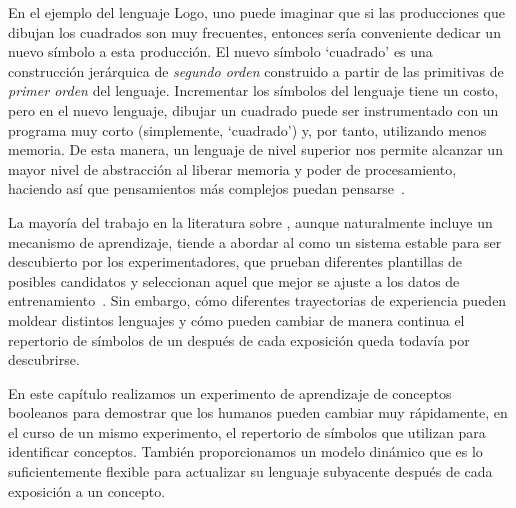En el ejemplo del lenguaje Logo, uno puede imaginar que si las producciones que dibujan los cuadrados son muy frecuentes, entonces sería conveniente dedicar un nuevo símbolo a esta producción. El nuevo símbolo `cuadrado' es una construcción jerárquica de {\em segundo orden} construido a partir de las primitivas de {\em primer orden} del lenguaje. Incrementar los símbolos del lenguaje tiene un costo, pero en el nuevo lenguaje, dibujar un cuadrado puede ser instrumentado con un programa muy corto (simplemente, `cuadrado') y, por tanto, utilizando menos memoria. De esta manera, un lenguaje de nivel superior nos permite alcanzar un mayor nivel de abstracción al liberar memoria y poder de procesamiento, haciendo así que pensamientos más complejos puedan pensarse~\cite{minsky1967computation,murphy1988comprehending}.


La mayoría del trabajo en la literatura sobre \lot, aunque naturalmente incluye un mecanismo de aprendizaje, tiende a abordar al \lot como un sistema estable para ser descubierto por los experimentadores, que prueban diferentes plantillas de posibles candidatos y seleccionan aquel que mejor se ajuste a los datos de entrenamiento~\cite{goodman2008rational,kemp2012exploring,piantadosi2016logical}. Sin embargo, cómo diferentes trayectorias de experiencia pueden moldear distintos lenguajes y cómo pueden cambiar de manera continua el repertorio de símbolos de un \lot después de cada exposición queda todavía por descubrirse.


En este capítulo realizamos un experimento de aprendizaje de conceptos booleanos para demostrar que los humanos pueden cambiar muy rápidamente, en el curso de un mismo experimento, el repertorio de símbolos que utilizan para identificar conceptos. También proporcionamos un modelo dinámico que es lo suficientemente flexible para actualizar su lenguaje subyacente después de cada exposición a un concepto.

